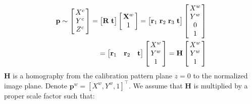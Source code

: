 \documentclass{report}
\begin{document}
\begin{equation}
\begin{split}
\mathbf{p} \sim 
\arraycolsep=1.5pt%
\begin{bmatrix}
	\begin{array}{c}
	X^c \\ Y^c \\ Z^c
	\end{array}
\end{bmatrix} 
= 
\begin{bmatrix}
\mathbf{R} & \mathbf{t}
\end{bmatrix}
\arraycolsep=1.5pt%
\begin{bmatrix}
	\begin{array}{c}
	\mathbf{X}^w \\ 1
	\end{array}
\end{bmatrix}
= 
\begin{bmatrix}
\mathbf{r}_1 & \mathbf{r}_2 & \mathbf{r}_3 & \mathbf{t}
\end{bmatrix}
\arraycolsep=1.5pt%
\begin{bmatrix}
	\begin{array}{c}
	X^w \\ Y^w \\ 0 \\ 1
	\end{array}
\end{bmatrix}\\
= 
\begin{bmatrix}
\mathbf{r}_1 & \mathbf{r}_2 & \mathbf{t}
\end{bmatrix}
\arraycolsep=1.5pt%
\begin{bmatrix}
	\begin{array}{c}
	X^w \\ Y^w \\ 1
	\end{array}
\end{bmatrix}
=\mathbf{H}
\arraycolsep=1.5pt%
\begin{bmatrix}
	\begin{array}{c}
	X^w \\ Y^w \\ 1
	\end{array}
\end{bmatrix}
\end{split}
\end{equation}
$\mathbf{H}$ is a homography from the calibration pattern plane $z = 0$ to the normalized image plane. Denote $\mathbf{p}^w = [X^w, Y^w, 1]^\top$. We assume that $\mathbf{H}$ is multiplied by a proper scale factor such that: 
\end{document}
